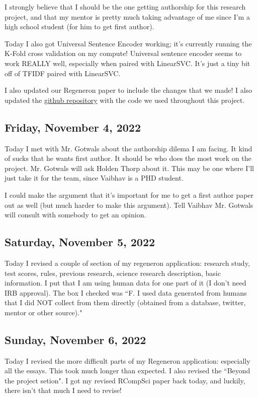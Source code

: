 \documentclass[11pt,letterpaper]{article}
\begin{document}
I strongly believe that I should be the one getting authorship for this research project, and that my mentor is pretty much taking advantage of me since I'm a high school student (for him to get first author).

Today I also got Universal Sentence Encoder working; it's currently running the K-Fold cross validation on my compute! Universal sentence encoder seems to work REALLY well, especially when paired with LinearSVC. It's just a tiny bit off of TFIDF paired with LinearSVC.

I also updated our Regeneron paper to include the changes that we made! I also updated the \href{https://github.com/ganning127/identifying-provocative-sentences}{github repository} with the code we used throughout this project. 

\subsection{Friday, November 4, 2022}
Today I met with Mr. Gotwals about the authorship dilema I am facing. It kind of sucks that he wants first author. It should be who does the most work on the project. Mr. Gotwals will ask Holden Thorp about it. This may be one where I'll just take it for the team, since Vaibhav is a PHD student. 

I could make the argument that it's important for me to get a first author paper out as well (but much harder to make this argument). Tell Vaibhav Mr. Gotwals will consult with somebody to get an opinion.

\subsection{Saturday, November 5, 2022}
Today I revised a couple of section of my regeneron application: research study, test scores, rules, previous research, science research description, basic information. I put that I am using human data for one part of it (I don't need IRB approval). The box I checked was ``F. I used data generated from humans that I did NOT collect from them directly (obtained from a database, twitter, mentor or other source)."

\subsection{Sunday, November 6, 2022}
Today I revised the more difficult parts of my Regeneron application: especially all the essays. This took much longer than expected. I also revised the ``Beyond the project setion". I got my revised RCompSci paper back today, and luckily, there isn't that much I need to revise!
\end{document}

